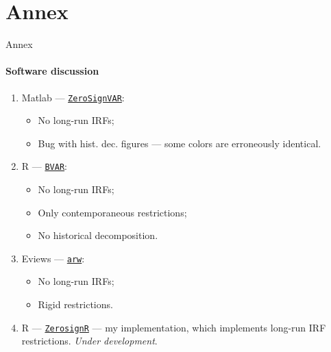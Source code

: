 \documentclass{beamer}
\begin{document}
\section{Annex}
\begin{frame}[noframenumbering]{Annex}
\framesubtitle{Software discussion}
	\label{software}
	\begin{enumerate}
		\item Matlab --- \href{https://eeecon.uibk.ac.at/~breitenlechner/data/ZeroSignVAR.zip}{\texttt{ZeroSignVAR}}:
		\begin{itemize}
			\item No long-run IRFs;
			\item Bug with hist. dec. figures --- some colors are erroneously identical. 
		\end{itemize}
		\item R --- \href{https://cran.r-project.org/package=BVAR}{\texttt{BVAR}}:
			\begin{itemize}
			\item No long-run IRFs;
			\item Only contemporaneous restrictions;
			\item No historical decomposition. 
		\end{itemize}
		\item Eviews --- \href{https://www.eviews.com/Addins/arw.aipz}{\texttt{arw}}:
		\begin{itemize}
			\item No long-run IRFs;
			\item Rigid restrictions.
		\end{itemize}
		\item R --- \href{https://github.com/roootra/ZerosignR}{\texttt{ZerosignR}} --- my implementation, which implements long-run IRF restrictions. \textit{Under development}.
	\end{enumerate}
\end{frame}
\end{document}
